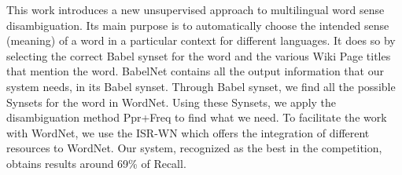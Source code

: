 This work introduces a new unsupervised approach to multilingual word sense disambiguation. Its main purpose is to automatically choose the intended sense
 (meaning) of a word in a particular context for different languages. It does so
 by selecting the correct Babel synset for the word and the various Wiki Page
 titles that mention the word. BabelNet contains all the output information that
 our system needs, in its Babel synset. Through Babel synset, we find all the
 possible Synsets for the word in WordNet. Using these Synsets, we apply the
 disambiguation method Ppr+Freq to find what we need. To facilitate the work
 with WordNet, we use the ISR-WN which offers the integration of different
 resources to WordNet. Our system, recognized as the best in the competition,
 obtains results around 69\% of Recall.


